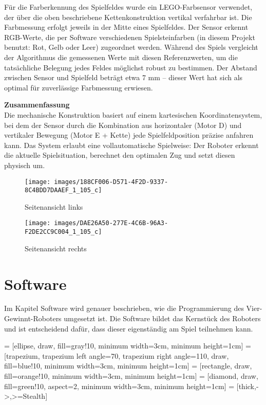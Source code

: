 \begin{itemize}
	 Für die Farberkennung des Spielfeldes wurde ein LEGO-Farbsensor verwendet, der über die oben beschriebene Kettenkonstruktion vertikal verfahrbar ist. Die Farbmessung erfolgt jeweils in der Mitte eines Spielfeldes. Der Sensor erkennt RGB-Werte, die per Software verschiedenen Spielsteinfarben (in diesem Projekt benutzt: Rot, Gelb oder Leer) zugeordnet werden. Während des Spiels vergleicht der Algorithmus die gemessenen Werte mit diesen Referenzwerten, um die tatsächliche Belegung jedes Feldes möglichst robust zu bestimmen. Der Abstand zwischen Sensor und Spielfeld beträgt etwa 7 mm – dieser Wert hat sich als optimal für zuverlässige Farbmessung erwiesen.
\end{itemize}
\textbf{Zusammenfassung}\\
Die mechanische Konstruktion basiert auf einem kartesischen Koordinatensystem, bei dem der Sensor durch die Kombination aus horizontaler (Motor D) und vertikaler Bewegung (Motor E + Kette) jede Spielfeldposition präzise anfahren kann. Das System erlaubt eine vollautomatische Spielweise: Der Roboter erkennt die aktuelle Spielsituation, berechnet den optimalen Zug und setzt diesen physisch um.


\begin{figure}[H]
	\centering
	\texttt{[image: images/188CF006-D571-4F2D-9337-8C4BDD7DAAEF\_1\_105\_c]}
	\caption{Seitenansicht links}
	\label{fig:188cf006-d571-4f2d-9337-8c4bdd7daaef1105c}
\end{figure}


\begin{figure}[H]
	\centering
	\texttt{[image: images/DAE26A50-277E-4C6B-96A3-F2DE2CC9C004\_1\_105\_c]}
	\caption{Seitenansicht rechts}
	\label{fig:dae26a50-277e-4c6b-96a3-f2de2cc9c0041105c}
\end{figure}


\section{Software}
Im Kapitel Software wird genauer beschrieben, wie die Programmierung des Vier-Gewinnt-Roboters umgesetzt ist. Die Software bildet das Kernstück des Roboters und ist entscheidend dafür, dass dieser eigenständig am Spiel teilnehmen kann.



 = [ellipse, draw, fill=gray!10, minimum width=3cm, minimum height=1cm]
 = [trapezium, trapezium left angle=70, trapezium right angle=110, draw, fill=blue!10, minimum width=3cm, minimum height=1cm]
 = [rectangle, draw, fill=orange!10, minimum width=3cm, minimum height=1cm]
 = [diamond, draw, fill=green!10, aspect=2, minimum width=3cm, minimum height=1cm]
 = [thick,->,>=Stealth]

